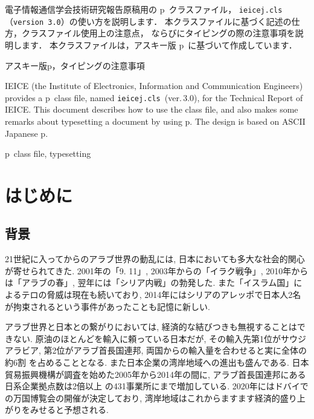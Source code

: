 \documentclass[technicalreport]{ieicej}
\def\IEICEJcls{\texttt{ieicej.cls}}
\def\IEICEJver{3.0}
\begin{document}
\begin{jabstract}
電子情報通信学会技術研究報告原稿用の p\LaTeXe\ クラスファイル，
\IEICEJcls{}（\texttt{version \IEICEJver}）の使い方を説明します．
本クラスファイルに基づく記述の仕方，クラスファイル使用上の注意点，
ならびにタイピングの際の注意事項を説明します．
本クラスファイルは，アスキー版 p\LaTeXe\ に基づいて作成しています．
\end{jabstract}
\begin{jkeyword}
アスキー版p\LaTeXe{}，タイピングの注意事項
\end{jkeyword}
\begin{eabstract}
IEICE (the Institute of Electronics, Information 
and Communication Engineers) provides 
a p\LaTeXe\ class file, named \IEICEJcls\ (ver.\,\IEICEJver), 
for the Technical Report of IEICE. 
This document describes how to use the class file, 
and also makes some remarks about typesetting a document by using p\LaTeXe. 
The design is based on ASCII Japanese p\LaTeXe. 
\end{eabstract}
\begin{ekeyword}
p\LaTeXe\ class file, typesetting
\end{ekeyword}
\maketitle

\section{はじめに}
\subsection{背景}

21世紀に入ってからのアラブ世界の動乱には, 日本においても多大な社会的関心が寄せられてきた. 2001年の「9. 11」, 2003年からの「イラク戦争」, 2010年からは「アラブの春」, 翌年には「シリア内戦」の勃発した. また「イスラム国」によるテロの脅威は現在も続いており, 2014年にはシリアのアレッポで日本人2名が拘束されるという事件があったことも記憶に新しい. 
 
アラブ世界と日本との繋がりにおいては, 経済的な結びつきも無視することはできない. 原油のほとんどを輸入に頼っている日本だが, その輸入先第1位がサウジアラビア, 第2位がアラブ首長国連邦, 両国からの輸入量を合わせると実に全体の約6割 を占めることとなる. また日本企業の湾岸地域への進出も盛んである. 日本貿易振興機構が調査を始めた2005年から2014年の間に, アラブ首長国連邦にある日系企業拠点数は2倍以上 の431事業所にまで増加している. 2020年にはドバイでの万国博覧会の開催が決定しており, 湾岸地域はこれからますます経済的盛り上がりをみせると予想される. 
\end{document}
